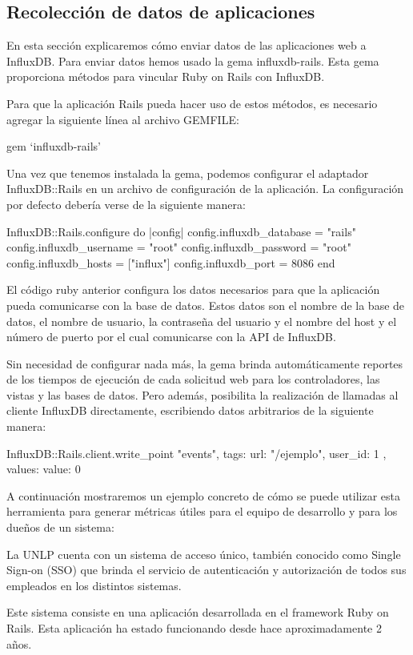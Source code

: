 \subsection{Recolección de datos de aplicaciones}
\label{aplicaciones}

En  esta sección explicaremos cómo enviar datos de las aplicaciones web a InfluxDB.
Para enviar datos hemos usado la gema influxdb-rails.
Esta gema proporciona métodos para vincular Ruby on Rails con InfluxDB.

Para que la aplicación Rails pueda hacer uso de estos métodos, es necesario agregar la siguiente línea al archivo GEMFILE:

gem ‘influxdb-rails’

Una vez que tenemos instalada la gema, podemos configurar el adaptador InfluxDB::Rails en un archivo de configuración de la aplicación. La configuración por defecto debería verse de la siguiente manera:

InfluxDB::Rails.configure do |config|
  config.influxdb_database = "rails"
  config.influxdb_username = "root"
  config.influxdb_password = "root"
  config.influxdb_hosts    = ["influx"]
  config.influxdb_port     = 8086
end

El código ruby anterior configura los datos necesarios para que la aplicación pueda comunicarse con la base de datos. Estos datos son el nombre de la base de datos, el nombre de usuario, la contraseña del usuario y el nombre del host y el número de puerto por el cual comunicarse con la API de InfluxDB.

Sin necesidad de configurar nada más, la gema brinda automáticamente reportes de los tiempos de ejecución de cada solicitud web para los controladores, las vistas y las bases de datos. Pero además, posibilita la realización de llamadas al cliente InfluxDB directamente, escribiendo datos arbitrarios de la siguiente manera:

InfluxDB::Rails.client.write_point "events",
  tags:   { url: "/ejemplo", user_id: 1 },
  values: { value: 0 }

A continuación mostraremos un ejemplo concreto de cómo se puede utilizar esta herramienta para generar métricas útiles para el equipo de desarrollo y para los dueños de un sistema:

La UNLP cuenta con un sistema de acceso único, también conocido como Single Sign-on (SSO) que brinda el servicio de autenticación y autorización de todos sus empleados en los distintos sistemas.

Este sistema consiste en una aplicación desarrollada en el framework Ruby on Rails. Esta aplicación ha estado funcionando desde hace aproximadamente 2 años.

